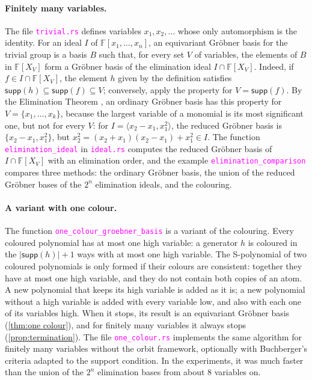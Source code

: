 \documentclass[12pt,a4paper,article]{memoir}
\newcommand{\F}{\mathbb{F}}
\newcommand{\poly}[2]{#1[#2]}
\newcommand{\idGen}[1]{\langle#1\rangle}
\newcommand{\code}[1]{\texttt{\textcolor{magenta}{#1}}}
\theoremstyle{definition}
\begin{document}
\paragraph{Finitely many variables.}
The file \code{trivial.rs} defines variables $x_1, x_2, \dots$ whose only automorphism is the identity.
For an ideal $I$ of $\poly{\F}{x_1, \dots, x_n}$,
an equivariant Gr\"{o}bner basis for the trivial group is a basis $B$ such that,
for every set $V$ of variables, the elements of $B$ in $\poly{\F}{X_V}$
form a Gr\"{o}bner basis of the elimination ideal $I \cap \poly{\F}{X_V}$.
Indeed, if $f \in I \cap \poly{\F}{X_V}$, the element $h$ given by the definition satisfies
$\mathsf{supp}(h) \subseteq \mathsf{supp}(f) \subseteq V$;
conversely, apply the property for $V = \mathsf{supp}(f)$.
By the Elimination Theorem \cite[Chapter 3, \S1]{CLO15},
an ordinary Gr\"{o}bner basis has this property for $V = \{x_1, \dots, x_k\}$,
because the largest variable of a monomial is its most significant one,
but not for every $V$:
for $I = \idGen{x_2 - x_1, x_1^2}$, the reduced Gr\"{o}bner basis is $\{x_2 - x_1, x_1^2\}$,
but $x_2^2 = (x_2 + x_1)(x_2 - x_1) + x_1^2 \in I$.
The function \code{elimination\_ideal} in \code{ideal.rs} computes the reduced Gr\"{o}bner basis of $I \cap \poly{\F}{X_V}$
with an elimination order, and the example \code{elimination\_comparison} compares three methods:
the ordinary Gr\"{o}bner basis,
the union of the reduced Gr\"{o}bner bases of the $2^n$ elimination ideals,
and the colouring.
%
\paragraph{A variant with one colour.}
The function \code{one\_colour\_groebner\_basis} is a variant of the colouring.
Every coloured polynomial has at most one high variable:
a generator $h$ is coloured in the $|\mathsf{supp}(h)| + 1$ ways with at most one high variable.
The S-polynomial of two coloured polynomials is only formed if their colours are consistent:
together they have at most one high variable, and they do not contain both copies of an atom.
A new polynomial that keeps its high variable is added as it is;
a new polynomial without a high variable is added with every variable low,
and also with each one of its variables high.
When it stops, its result is an equivariant Gr\"{o}bner basis (\cref{thm:one colour}),
and for finitely many variables it always stops (\cref{prop:termination}).
The file \code{one\_colour.rs} implements the same algorithm for finitely many variables
without the orbit framework, optionally with Buchberger's criteria adapted to the support condition.
In the experiments, it was much faster than the union of the $2^n$ elimination bases from about $8$ variables on.
%
\end{document}
